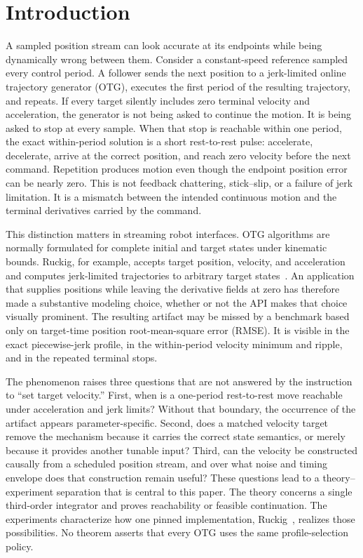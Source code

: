 \section{Introduction}
\label{sec:introduction}

A sampled position stream can look accurate at its endpoints while being dynamically wrong between them. Consider a constant-speed reference sampled every control period. A follower sends the next position to a jerk-limited online trajectory generator (OTG), executes the first period of the resulting trajectory, and repeats. If every target silently includes zero terminal velocity and acceleration, the generator is not being asked to continue the motion. It is being asked to stop at every sample. When that stop is reachable within one period, the exact within-period solution is a short rest-to-rest pulse: accelerate, decelerate, arrive at the correct position, and reach zero velocity before the next command. Repetition produces \stopandgo{} motion even though the endpoint position error can be nearly zero. This is not feedback chattering, stick--slip, or a failure of jerk limitation. It is a mismatch between the intended continuous motion and the terminal derivatives carried by the command.

This distinction matters in streaming robot interfaces. OTG algorithms are normally formulated for complete initial and target states under kinematic bounds. Ruckig, for example, accepts target position, velocity, and acceleration and computes jerk-limited trajectories to arbitrary target states~\cite{berscheid2021ruckig}. An application that supplies positions while leaving the derivative fields at zero has therefore made a substantive modeling choice, whether or not the API makes that choice visually prominent. The resulting artifact may be missed by a benchmark based only on target-time position root-mean-square error (RMSE). It is visible in the exact piecewise-jerk profile, in the within-period velocity minimum and ripple, and in the repeated terminal stops.

The phenomenon raises three questions that are not answered by the instruction to ``set target velocity.'' First, when is a one-period rest-to-rest move reachable under acceleration and jerk limits? Without that boundary, the occurrence of the artifact appears parameter-specific. Second, does a matched velocity target remove the mechanism because it carries the correct state semantics, or merely because it provides another tunable input? Third, can the velocity be constructed causally from a scheduled position stream, and over what noise and timing envelope does that construction remain useful? These questions lead to a theory--experiment separation that is central to this paper. The theory concerns a single third-order integrator and proves reachability or feasible continuation. The experiments characterize how one pinned implementation, Ruckig~\RuckigVersion, realizes those possibilities. No theorem asserts that every OTG uses the same profile-selection policy.

